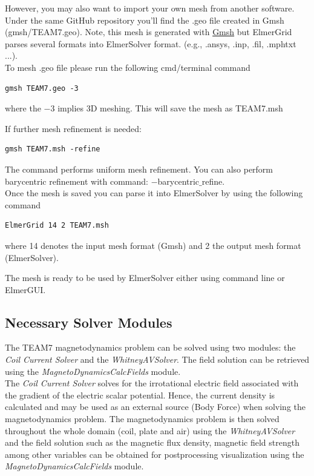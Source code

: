  \noindent However,  you may also want to import your own mesh from another software.  Under the same GitHub repository you'll find the .geo file created in Gmsh (gmsh/TEAM7.geo).  Note,  this mesh is generated with \href{http://gmsh.info}{Gmsh} but ElmerGrid parses several formats into ElmerSolver format. (e.g., .ansys, .inp, .fil, .mphtxt ...). \\
 
\noindent To mesh .geo file please run the following cmd/terminal command

\begin{verbatim}
gmsh TEAM7.geo -3
\end{verbatim}

\noindent where the $-$3 implies 3D meshing. This will save the mesh as TEAM7.msh

\noindent If further mesh refinement is needed:

\begin{verbatim}
gmsh TEAM7.msh -refine
\end{verbatim}

\noindent The command performs uniform mesh refinement. You can also perform barycentric refinement with command: $-$barycentric$\_$refine. \\
 
\noindent Once the mesh is saved you can parse it into ElmerSolver by using the following command

\begin{verbatim}
ElmerGrid 14 2 TEAM7.msh
\end{verbatim}

\noindent where 14 denotes the input mesh format (Gmsh) and 2 the output mesh format (ElmerSolver).  

\noindent The mesh is ready to be used by ElmerSolver either using command line or ElmerGUI.
 
 
 
\subsection*{Necessary Solver Modules} 
 
The TEAM7 magnetodynamics problem can be solved using two modules: the \textit{Coil Current Solver} and the \textit{WhitneyAVSolver}.  The field solution can be retrieved using the \textit{MagnetoDynamicsCalcFields} module.\\

The \textit{Coil Current Solver} solves for the irrotational electric field associated with the gradient of the electric scalar potential.  Hence,  the current density is calculated and may be used as an external source (Body Force) when solving the magnetodynamics problem.  The magnetodynamics problem is then solved throughout the whole domain (coil,  plate and air) using the  \textit{WhitneyAVSolver} and the field solution such as the magnetic flux density,  magnetic field strength among other variables can be obtained for postprocessing visualization using the \textit{MagnetoDynamicsCalcFields} module.



